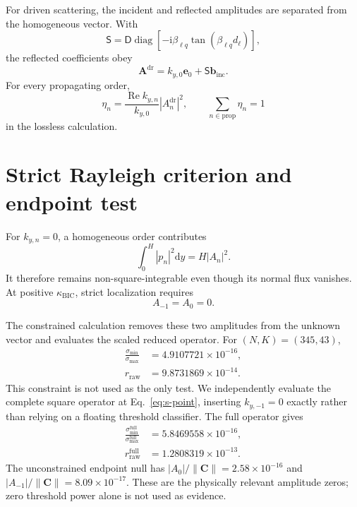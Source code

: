 \documentclass[aps,prl,reprint,superscriptaddress,nofootinbib,floatfix]{revtex4-2}
\newcommand{\ii}{\mathrm{i}}
\newcommand{\driv}{\mathrm{dr}}
\newcommand{\BIC}{\mathrm{BIC}}
\begin{document}
For driven scattering, the incident and reflected amplitudes are separated
from the homogeneous vector.  With
\begin{equation}
 \mathsf S=\mathsf D\operatorname{diag}
 [-\ii\beta_{\ell q}\tan(\beta_{\ell q}d_\ell)],
\end{equation}
the reflected coefficients obey
\begin{equation}
 [\operatorname{diag}(k_{y,n})-\mathsf S\mathsf B]\bm A^{\driv}
 =k_{y,0}\bm e_0+\mathsf S\bm b_{\mathrm{inc}}.
 \label{eq:s-driven}
\end{equation}
For every propagating order,
\begin{equation}
 \eta_n=\frac{\operatorname{Re}k_{y,n}}{k_{y,0}}
 |A_n^{\driv}|^2,\qquad \sum_{n\in\mathrm{prop}}\eta_n=1
 \label{eq:s-power}
\end{equation}
in the lossless calculation.

\section{Strict Rayleigh criterion and endpoint test}

For $k_{y,n}=0$, a homogeneous order contributes
\begin{equation}
 \int_0^H|p_n|^2\mathrm{d}y=H|A_n|^2.
 \label{eq:s-linear-norm}
\end{equation}
It therefore remains non-square-integrable even though its normal flux
vanishes.  At positive $\kappa_{\BIC}$, strict localization requires
\begin{equation}
 A_{-1}=A_0=0.
 \label{eq:s-strict}
\end{equation}

The constrained calculation removes these two amplitudes from the unknown
vector and evaluates the scaled reduced operator.  For $(N,K)=(345,43)$,
\begin{equation}
 \begin{aligned}
 \frac{\sigma_{\min}}{\sigma_{\max}}&=4.9107721\times10^{-16},\\
 r_{\mathrm{raw}}&=9.8731869\times10^{-14}.
 \end{aligned}
 \label{eq:s-strictres}
\end{equation}
This constraint is not used as the only test.  We independently evaluate the
complete square operator at Eq.~\eqref{eq:s-point}, inserting
$k_{y,-1}=0$ exactly rather than relying on a floating threshold classifier.
The full operator gives
\begin{equation}
 \begin{aligned}
 \frac{\sigma_{\min}^{\mathrm{full}}}{\sigma_{\max}^{\mathrm{full}}}
 &=5.8469558\times10^{-16},\\
 r_{\mathrm{raw}}^{\mathrm{full}}&=1.2808319\times10^{-13}.
 \end{aligned}
 \label{eq:s-fullres}
\end{equation}
The unconstrained endpoint null has
$|A_0|/\|\bm C\|=2.58\times10^{-16}$ and
$|A_{-1}|/\|\bm C\|=8.09\times10^{-17}$.  These are the physically relevant
amplitude zeros; zero threshold power alone is not used as evidence.
\end{document}
